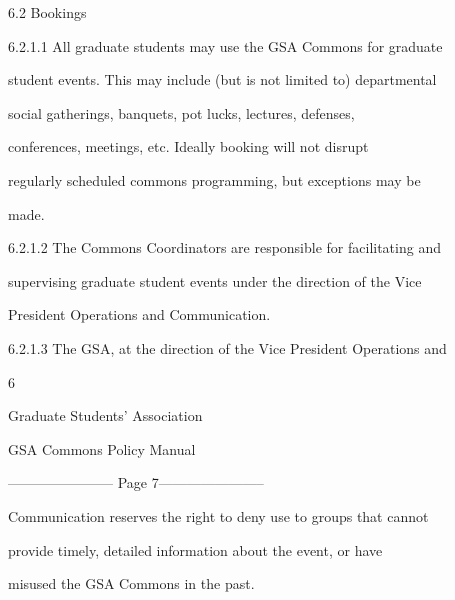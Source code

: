                                         6.2       Bookings   



  



6.2.1.1  All  graduate  students  may  use  the  GSA  Commons  for  graduate  

            student events. This may include (but is not limited to) departmental  

            social      gatherings,        banquets,        pot     lucks,      lectures,      defenses,  

            conferences,        meetings,        etc.   Ideally      booking       will    not    disrupt  

            regularly scheduled commons programming, but exceptions may be  

            made.   



6.2.1.2   The  Commons  Coordinators  are  responsible  for  facilitating  and  

            supervising graduate student events under the direction of the Vice  

            President Operations and Communication.  



  



6.2.1.3   The  GSA,  at  the  direction  of  the  Vice  President  Operations  and  



                                                      6  

                                     

                                   Graduate Students’ Association  

                                   GSA Commons Policy Manual  

  


----------------------- Page 7-----------------------

             Communication reserves the right to deny use to groups that cannot  

             provide   timely,   detailed   information   about   the   event,   or   have  

             misused the GSA Commons in the past.   



  



